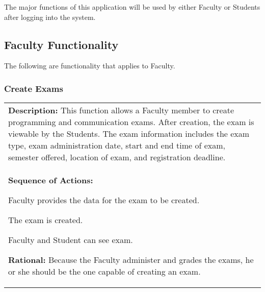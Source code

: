 
\newenvironment{boxed}
 {\begin{center} \begin{tabular}{|p{0.9\textwidth}|}
 \hline
 }
 { 
 \\\hline
 \end{tabular} 
 \end{center}
 }

The major functions of this application will be used by either Faculty or Students
after logging into the system.

\subsection{Faculty Functionality}
The following are functionality that applies to Faculty.

   \subsubsection{\large Create Exams} 
   \begin{boxed} %
      \textbf{Description:}
      {\small This function allows a Faculty member to create programming and
         communication exams. After creation, the exam is viewable by the
         Students. The exam information includes the exam type, exam
         administration date, start and end time of exam, semester offered,
         location of exam, and registration deadline.} \\

      \textbf{Sequence of Actions:}
      \begin{enumerate}
            {\small
         \item Faculty provides the data for the exam to be created.
         \item The exam is created.
         \item Faculty and Student can see exam.}
      \end{enumerate}

      \textbf{Rational:}
      {\small Because the Faculty administer and grades the exams, he or she should
      be the one capable of creating an exam.}
   \end{boxed} %

